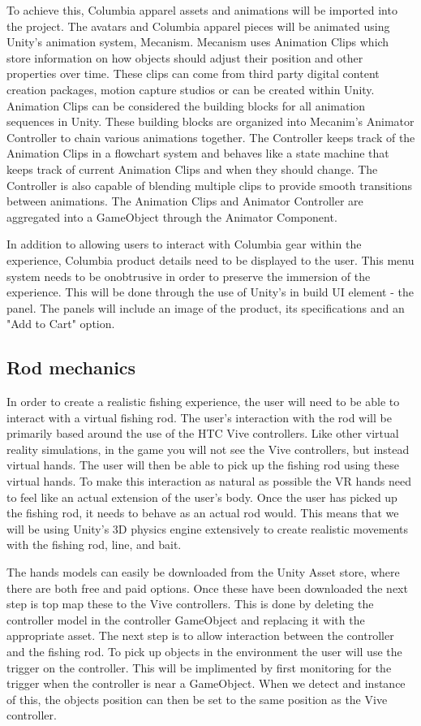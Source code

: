 \documentclass[10pt,journal,compsoc,onecolumn, draftclsnofoot]{IEEEtran}
\begin{document}
To achieve this, Columbia apparel assets and animations will be imported into the project. The avatars and Columbia apparel pieces will be animated using Unity's animation system, Mecanism. Mecanism uses Animation Clips which store information on how objects should adjust their position and other properties over time. These clips can come from third party digital content creation packages, motion capture studios or can be created within Unity. Animation Clips can be considered the building blocks for all animation sequences in Unity. These building blocks are organized into Mecanim's Animator Controller to chain various animations together. The Controller keeps track of the Animation Clips in a flowchart system and behaves like a state machine that keeps track of current Animation Clips and when they should change. The Controller is also capable of blending multiple clips to provide smooth transitions between animations. The Animation Clips and Animator Controller are aggregated into a GameObject through the Animator Component.\cite{unity_animation}

In addition to allowing users to interact with Columbia gear within the experience, Columbia product details need to be displayed to the user. This menu system needs to be onobtrusive in order to preserve the immersion of the experience. This will be done through the use of Unity's in build UI element - the panel. The panels will include an image of the product, its specifications and an "Add to Cart" option.

\subsection{Rod mechanics}
In order to create a realistic fishing experience, the user will need to be able to interact with a virtual fishing rod.
The user's interaction with the rod will be primarily based around the use of the HTC Vive controllers.
Like other virtual reality simulations, in the game you will not see the Vive controllers, but instead virtual hands.
The user will then be able to pick up the fishing rod using these virtual hands.
To make this interaction as natural as possible the VR hands need to feel like an actual extension of the user's body.
Once the user has picked up the fishing rod, it needs to behave as an actual rod would.
This means that we will be using Unity's 3D physics engine extensively to create realistic movements with the fishing rod, line, and bait.

The hands models can easily be downloaded from the Unity Asset store, where there are both free and paid options.
Once these have been downloaded the next step is top map these to the Vive controllers.
This is done by deleting the controller model in the controller GameObject and replacing it with the appropriate asset.
The next step is to allow interaction between the controller and the fishing rod.
To pick up objects in the environment the user will use the trigger on the controller.
This will be implimented by first monitoring for the trigger when the controller is near a GameObject.
When we detect and instance of this, the objects position can then be set to the same position as the Vive controller.
\end{document}

